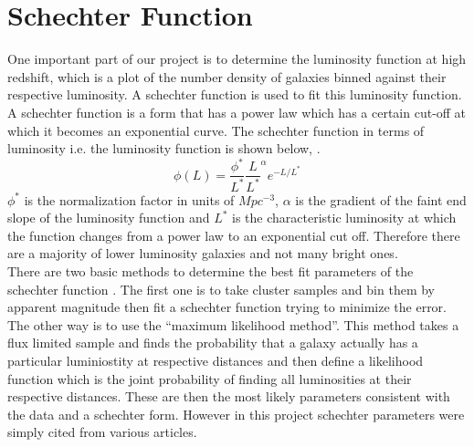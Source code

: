 \documentclass{article}
\begin{document}
\section{Schechter Function}
One important part of our project is to determine the luminosity function at high redshift, which is a plot of the number density of galaxies binned against their respective luminosity. A schechter function is used to fit this luminosity function. A schechter function is a form that has a power law which has a certain cut-off at which it becomes an exponential curve. The schechter function in terms of luminosity i.e. the luminosity function is shown below, \cite{cosmo_number_densities}.
\begin{equation}
\phi(L)=\frac{\phi^{*}}{L^{*}}\frac{L}{L^{*}}^{\alpha}e^{-L/L^{*}}
\end{equation}
\indent $\phi^{*}$ is the normalization factor in units of $Mpc^{-3}$, $\alpha$ is the gradient of the faint end slope of the luminosity function and $L^{*}$ is the characteristic luminosity at which the function changes from a power law to an exponential cut off. Therefore there are a majority of lower luminosity galaxies and not many bright ones.\\

\indent There are two basic methods to determine the best fit parameters of the schechter function \cite{luminosity_functions_online}. The first one is to take cluster samples and bin them by apparent magnitude then fit a schechter function trying to minimize the error. The other way is to use the ``maximum likelihood method''. This method takes a flux limited sample and finds the probability that a galaxy actually has a particular luminiostity at respective distances and then define a likelihood function which is the joint probability of finding all luminosities at their respective distances. These are then the most likely parameters consistent with the data and a schechter form. However in this project schechter parameters were simply cited from various articles.\\
\end{document}
